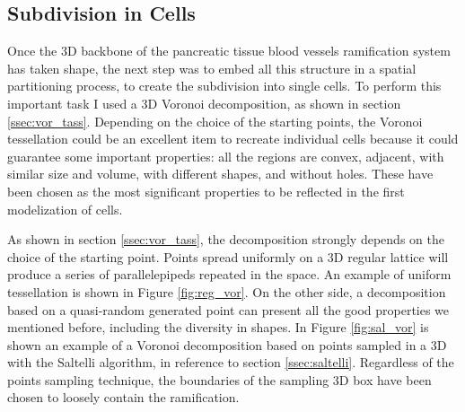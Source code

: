 \subsection{Subdivision in Cells}
    Once the 3D backbone of the pancreatic tissue blood vessels ramification system has taken shape, the next step was to embed all this structure in a spatial partitioning process, to create the subdivision into single cells. To perform this important task I used a 3D Voronoi decomposition, as shown in section \ref{ssec:vor_tass}. Depending on the choice of the starting points, the Voronoi tessellation could be an excellent item to recreate individual cells because it could guarantee some important properties: all the regions are convex, adjacent, with similar size and volume, with different shapes, and without holes. These have been chosen as the most significant properties to be reflected in the first modelization of cells.

    As shown in section \ref{ssec:vor_tass}, the decomposition strongly depends on the choice of the starting point. Points spread uniformly on a 3D regular lattice will produce a series of parallelepipeds repeated in the space. An example of uniform tessellation is shown in Figure \ref{fig:reg_vor}. On the other side, a decomposition based on a quasi-random generated point can present all the good properties we mentioned before, including the diversity in shapes. In Figure \ref{fig:sal_vor} is shown an example of a Voronoi decomposition based on points sampled in a 3D with the Saltelli algorithm, in reference to section \ref{ssec:saltelli}. Regardless of the points sampling technique, the boundaries of the sampling 3D box have been chosen to loosely contain the ramification.

